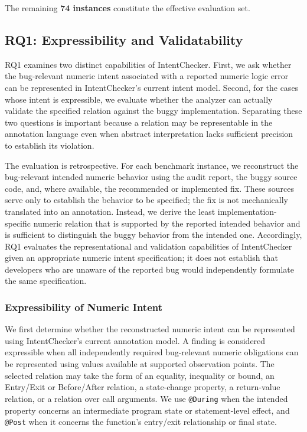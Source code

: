 \documentclass[pdflatex,sn-basic]{sn-jnl}%
\theoremstyle{thmstyleone}%
\theoremstyle{thmstyletwo}%
\theoremstyle{thmstylethree}%
\begin{document}
The remaining \textbf{74 instances} constitute the effective evaluation set.

\subsection{RQ1: Expressibility and Validatability}\label{sec:rq1}

RQ1 examines two distinct capabilities of IntentChecker. First, we ask whether the
bug-relevant numeric intent associated with a reported numeric logic error can be
represented in IntentChecker's current intent model. Second, for the cases whose
intent is expressible, we evaluate whether the analyzer can actually validate the
specified relation against the buggy implementation. Separating these two questions
is important because a relation may be representable in the annotation language even
when abstract interpretation lacks sufficient precision to establish its violation.

The evaluation is retrospective. For each benchmark instance, we reconstruct the
bug-relevant intended numeric behavior using the audit report, the buggy source code,
and, where available, the recommended or implemented fix. These sources serve only
to establish the behavior to be specified; the fix is not mechanically translated into
an annotation. Instead, we derive the least implementation-specific numeric relation
that is supported by the reported intended behavior and is sufficient to distinguish
the buggy behavior from the intended one. Accordingly, RQ1 evaluates the
representational and validation capabilities of IntentChecker given an appropriate
numeric intent specification; it does not establish that developers who are unaware
of the reported bug would independently formulate the same specification.


\subsubsection{Expressibility of Numeric Intent}\label{sec:rq1:expressibility}

We first determine whether the reconstructed numeric intent can be represented using
IntentChecker's current annotation model. A finding is considered expressible when
all independently required bug-relevant numeric obligations can be represented using
values available at supported observation points. The selected relation may take the
form of an equality, inequality or bound, an Entry/Exit or Before/After relation, a
state-change property, a return-value relation, or a relation over call arguments.
We use \texttt{@During} when the intended property concerns an intermediate program
state or statement-level effect, and \texttt{@Post} when it concerns the function's
entry/exit relationship or final state.
\end{document}
